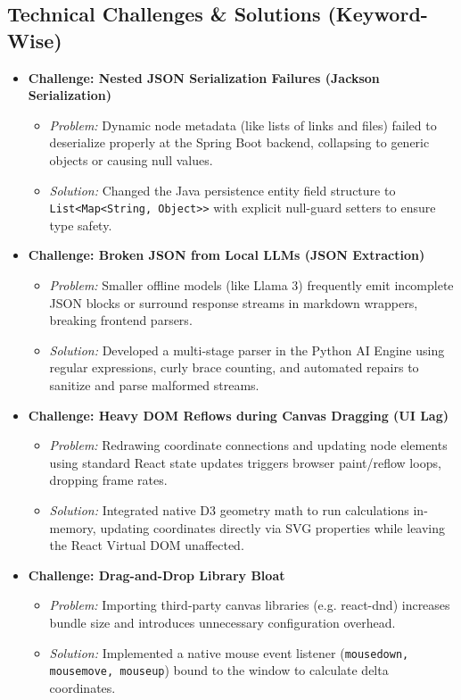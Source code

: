 \documentclass[12pt, a4paper]{article}
\begin{document}
\subsection{Technical Challenges \& Solutions (Keyword-Wise)}
\begin{itemize}[leftmargin=*]
  \item \textbf{Challenge: Nested JSON Serialization Failures (Jackson Serialization)}
    \begin{itemize}
      \item \textit{Problem:} Dynamic node metadata (like lists of links and files) failed to deserialize properly at the Spring Boot backend, collapsing to generic objects or causing null values.
      \item \textit{Solution:} Changed the Java persistence entity field structure to \texttt{List<Map<String, Object>>} with explicit null-guard setters to ensure type safety.
    \end{itemize}
  \item \textbf{Challenge: Broken JSON from Local LLMs (JSON Extraction)}
    \begin{itemize}
      \item \textit{Problem:} Smaller offline models (like Llama 3) frequently emit incomplete JSON blocks or surround response streams in markdown wrappers, breaking frontend parsers.
      \item \textit{Solution:} Developed a multi-stage parser in the Python AI Engine using regular expressions, curly brace counting, and automated repairs to sanitize and parse malformed streams.
    \end{itemize}
  \item \textbf{Challenge: Heavy DOM Reflows during Canvas Dragging (UI Lag)}
    \begin{itemize}
      \item \textit{Problem:} Redrawing coordinate connections and updating node elements using standard React state updates triggers browser paint/reflow loops, dropping frame rates.
      \item \textit{Solution:} Integrated native D3 geometry math to run calculations in-memory, updating coordinates directly via SVG properties while leaving the React Virtual DOM unaffected.
    \end{itemize}
  \item \textbf{Challenge: Drag-and-Drop Library Bloat}
    \begin{itemize}
      \item \textit{Problem:} Importing third-party canvas libraries (e.g. react-dnd) increases bundle size and introduces unnecessary configuration overhead.
      \item \textit{Solution:} Implemented a native mouse event listener (\texttt{mousedown, mousemove, mouseup}) bound to the window to calculate delta coordinates.
    \end{itemize}
\end{itemize}
\end{document}
